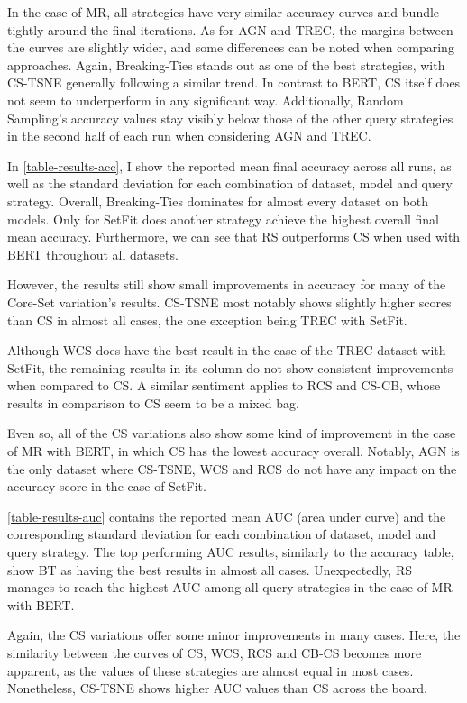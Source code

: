 \documentclass[english,bachelor,ul]{webisthesis} %
\begin{document}
In the case of MR, all strategies have very similar accuracy curves and bundle tightly around the final iterations. As for AGN and TREC, the margins between the curves are slightly wider, and some differences can be noted when comparing approaches. Again, Breaking-Ties stands out as one of the best strategies, with CS-TSNE generally following a similar trend. In contrast to BERT, CS itself does not seem to underperform in any significant way. Additionally, Random Sampling's accuracy values stay visibly below those of the other query strategies in the second half of each run when considering AGN and TREC.

In \ref{table-results-acc}, I show the reported mean final accuracy across all runs, as well as the standard deviation for each combination of dataset, model and query strategy. Overall, Breaking-Ties dominates for almost every dataset on both models. Only for SetFit does another strategy achieve the highest overall final mean accuracy. Furthermore, we can see that RS outperforms CS when used with BERT throughout all datasets.

However, the results still show small improvements in accuracy for many of the Core-Set variation's results. CS-TSNE most notably shows slightly higher scores than CS in almost all cases, the one exception being TREC with SetFit. 

Although WCS does have the best result in the case of the TREC dataset with SetFit, the remaining results in its column do not show consistent improvements when compared to CS. A similar sentiment applies to RCS and CS-CB, whose results in comparison to CS seem to be a mixed bag. 

Even so, all of the CS variations also show some kind of improvement in the case of MR with BERT, in which CS has the lowest accuracy overall. Notably, AGN is the only dataset where CS-TSNE, WCS and RCS do not have any impact on the accuracy score in the case of SetFit.

\ref{table-results-auc} contains the reported mean AUC (area under curve) and the corresponding standard deviation for each combination of dataset, model and query strategy. The top performing AUC results, similarly to the accuracy table, show BT as having the best results in almost all cases. Unexpectedly, RS manages to reach the highest AUC among all query strategies in the case of MR with BERT.

Again, the CS variations offer some minor improvements in many cases. Here, the similarity between the curves of CS, WCS, RCS and CB-CS becomes more apparent, as the values of these strategies are almost equal in most cases. Nonetheless, CS-TSNE shows higher AUC values than CS across the board. 
\end{document}

